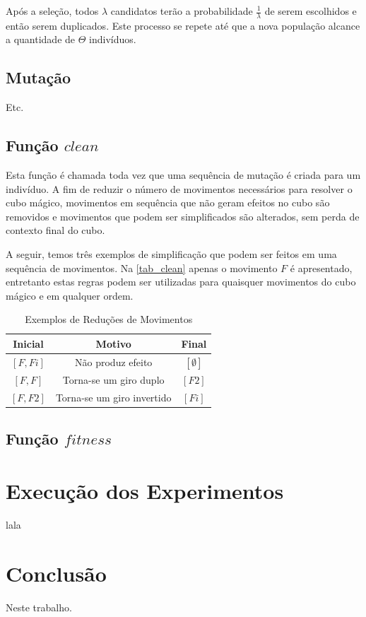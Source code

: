 \documentclass[12pt]{article}
\begin{document}
    Após a seleção, todos $\lambda$ candidatos terão a probabilidade $\frac{1}{\lambda}$ de serem escolhidos e então serem duplicados. Este processo se repete até que a nova população alcance a quantidade de $\Theta$ indivíduos.


  \subsection{Mutação}
    Etc.


  \subsection{Função $clean$} \label{clean}
    Esta função é chamada toda vez que uma sequência de mutação é criada para um indivíduo. A fim de reduzir o número de movimentos necessários para resolver o cubo mágico, movimentos em sequência que não geram efeitos no cubo são removidos e movimentos que podem ser simplificados são alterados, sem perda de contexto final do cubo.
    
    A seguir, temos três exemplos de simplificação que podem ser feitos em uma sequência de movimentos. Na \autoref{tab_clean} apenas o movimento $F$ é apresentado, entretanto estas regras podem ser utilizadas para quaisquer movimentos do cubo mágico e em qualquer ordem.

    \begin{table}[ht]
      \centering
      \caption{Exemplos de Reduções de Movimentos} \label{tab_clean}
      \begin{tabular}{|c|c|c|}
        \hline
        \textbf{Inicial} & \textbf{Motivo}              & \textbf{Final}    \\ \hline
            $[F, Fi]$    &  Não produz efeito           &  $[\emptyset]$    \\ \hline
            $[F, F]$     &  Torna-se um giro duplo      &  $[F2]$           \\ \hline
            $[F, F2]$    &  Torna-se um giro invertido  &  $[Fi]$           \\ \hline
      \end{tabular}
    \end{table}

  \subsection{Função $fitness$} \label{fit}
  

\section{Execução dos Experimentos}
  lala

\section{Conclusão}
  Neste trabalho.



\end{document}
